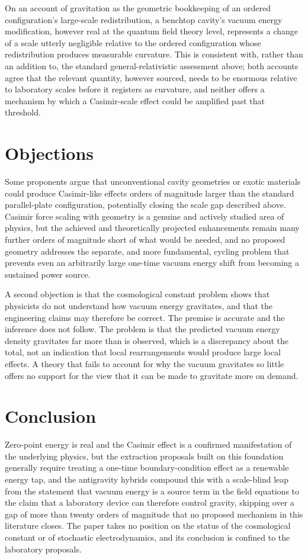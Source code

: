 \documentclass[11pt]{article}
\begin{document}
On an account of gravitation as the geometric bookkeeping of an ordered configuration's large-scale redistribution, a benchtop cavity's vacuum energy modification, however real at the quantum field theory level, represents a change of a scale utterly negligible relative to the ordered configuration whose redistribution produces measurable curvature. This is consistent with, rather than an addition to, the standard general-relativistic assessment above; both accounts agree that the relevant quantity, however sourced, needs to be enormous relative to laboratory scales before it registers as curvature, and neither offers a mechanism by which a Casimir-scale effect could be amplified past that threshold.

\section{Objections}

Some proponents argue that unconventional cavity geometries or exotic materials could produce Casimir-like effects orders of magnitude larger than the standard parallel-plate configuration, potentially closing the scale gap described above. Casimir force scaling with geometry is a genuine and actively studied area of physics, but the achieved and theoretically projected enhancements remain many further orders of magnitude short of what would be needed, and no proposed geometry addresses the separate, and more fundamental, cycling problem that prevents even an arbitrarily large one-time vacuum energy shift from becoming a sustained power source.

A second objection is that the cosmological constant problem shows that physicists do not understand how vacuum energy gravitates, and that the engineering claims may therefore be correct. The premise is accurate and the inference does not follow. The problem is that the predicted vacuum energy density gravitates far more than is observed, which is a discrepancy about the total, not an indication that local rearrangements would produce large local effects. A theory that fails to account for why the vacuum gravitates so little offers no support for the view that it can be made to gravitate more on demand.

\section{Conclusion}

Zero-point energy is real and the Casimir effect is a confirmed manifestation of the underlying physics, but the extraction proposals built on this foundation generally require treating a one-time boundary-condition effect as a renewable energy tap, and the antigravity hybrids compound this with a scale-blind leap from the statement that vacuum energy is a source term in the field equations to the claim that a laboratory device can therefore control gravity, skipping over a gap of more than twenty orders of magnitude that no proposed mechanism in this literature closes. The paper takes no position on the status of the cosmological constant or of stochastic electrodynamics, and its conclusion is confined to the laboratory proposals.
\end{document}
